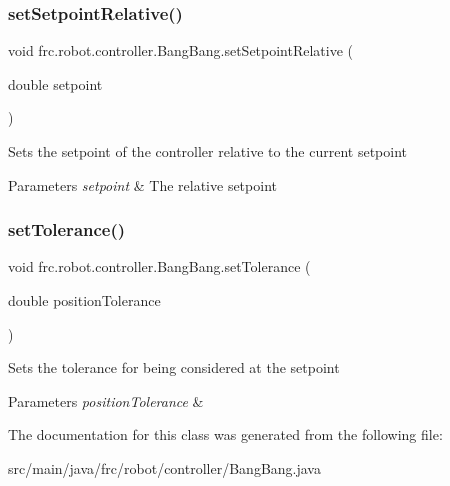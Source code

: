 \subsubsection{\texorpdfstring{setSetpointRelative()}{setSetpointRelative()}}
{\footnotesize\ttfamily void frc.\+robot.\+controller.\+Bang\+Bang.\+set\+Setpoint\+Relative (\begin{DoxyParamCaption}\item[{double}]{setpoint }\end{DoxyParamCaption})\hspace{0.3cm}{\ttfamily [inline]}}

Sets the setpoint of the controller relative to the current setpoint


\begin{DoxyParams}{Parameters}
{\em setpoint} & The relative setpoint \\
\hline
\end{DoxyParams}
\mbox{\label{classfrc_1_1robot_1_1controller_1_1_bang_bang_a5fa0322cdabcf45f3a8f5bccdf0f9eff}} 
\subsubsection{\texorpdfstring{setTolerance()}{setTolerance()}}
{\footnotesize\ttfamily void frc.\+robot.\+controller.\+Bang\+Bang.\+set\+Tolerance (\begin{DoxyParamCaption}\item[{double}]{position\+Tolerance }\end{DoxyParamCaption})\hspace{0.3cm}{\ttfamily [inline]}}

Sets the tolerance for being considered at the setpoint


\begin{DoxyParams}{Parameters}
{\em position\+Tolerance} & \\
\hline
\end{DoxyParams}


The documentation for this class was generated from the following file\+:\begin{DoxyCompactItemize}
\item 
src/main/java/frc/robot/controller/Bang\+Bang.\+java\end{DoxyCompactItemize}
